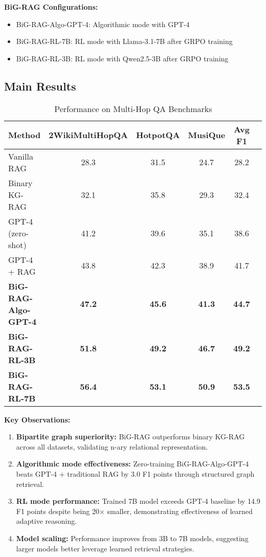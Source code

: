 \documentclass[11pt,a4paper]{article}
\begin{document}
\textbf{BiG-RAG Configurations:}
\begin{itemize}
    \item BiG-RAG-Algo-GPT-4: Algorithmic mode with GPT-4
    \item BiG-RAG-RL-7B: RL mode with Llama-3.1-7B after GRPO training
    \item BiG-RAG-RL-3B: RL mode with Qwen2.5-3B after GRPO training
\end{itemize}

\subsection{Main Results}

\begin{table}[h]
\centering
\caption{Performance on Multi-Hop QA Benchmarks}
\begin{tabular}{lccccc}
\toprule
\textbf{Method} & \textbf{2WikiMultiHopQA} & \textbf{HotpotQA} & \textbf{MusiQue} & \textbf{Avg F1} \\
\midrule
Vanilla RAG & 28.3 & 31.5 & 24.7 & 28.2 \\
Binary KG-RAG & 32.1 & 35.8 & 29.3 & 32.4 \\
GPT-4 (zero-shot) & 41.2 & 39.6 & 35.1 & 38.6 \\
GPT-4 + RAG & 43.8 & 42.3 & 38.9 & 41.7 \\
\midrule
\textbf{BiG-RAG-Algo-GPT-4} & \textbf{47.2} & \textbf{45.6} & \textbf{41.3} & \textbf{44.7} \\
\textbf{BiG-RAG-RL-3B} & \textbf{51.8} & \textbf{49.2} & \textbf{46.7} & \textbf{49.2} \\
\textbf{BiG-RAG-RL-7B} & \textbf{56.4} & \textbf{53.1} & \textbf{50.9} & \textbf{53.5} \\
\bottomrule
\end{tabular}
\end{table}

\textbf{Key Observations:}

\begin{enumerate}
    \item \textbf{Bipartite graph superiority:} BiG-RAG outperforms binary KG-RAG across all datasets, validating n-ary relational representation.

    \item \textbf{Algorithmic mode effectiveness:} Zero-training BiG-RAG-Algo-GPT-4 beats GPT-4 + traditional RAG by 3.0 F1 points through structured graph retrieval.

    \item \textbf{RL mode performance:} Trained 7B model exceeds GPT-4 baseline by 14.9 F1 points despite being 20$\times$ smaller, demonstrating effectiveness of learned adaptive reasoning.

    \item \textbf{Model scaling:} Performance improves from 3B to 7B models, suggesting larger models better leverage learned retrieval strategies.
\end{enumerate}
\end{document}

